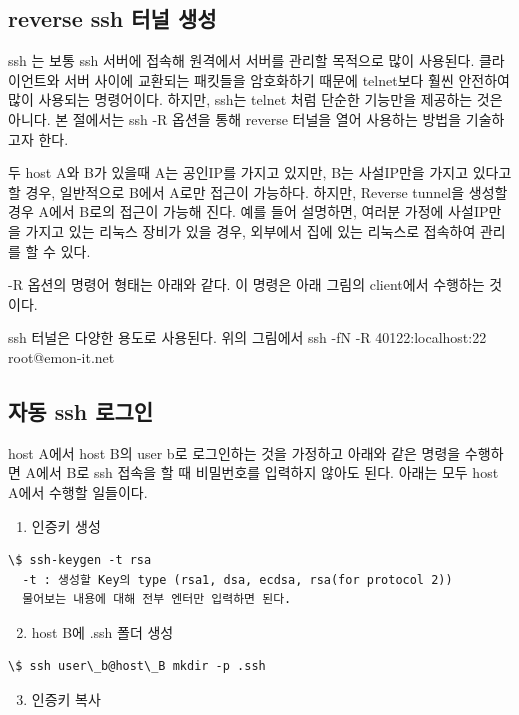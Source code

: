 \documentclass[letterpaper,10pt,english]{sphinxmanual}
\begin{document}
\subsection{reverse ssh 터널 생성}
\label{monitoring:reverse-ssh}
ssh 는 보통 ssh 서버에 접속해 원격에서 서버를 관리할 목적으로 많이
사용된다. 클라이언트와 서버 사이에 교환되는 패킷들을 암호화하기 때문에
telnet보다 훨씬 안전하여 많이 사용되는 명령어이다. 하지만, ssh는
telnet 처럼 단순한 기능만을 제공하는 것은 아니다.
본 절에서는 ssh -R 옵션을 통해 reverse 터널을 열어 사용하는 방법을
기술하고자 한다.

두 host A와 B가 있을때 A는 공인IP를 가지고 있지만, B는
사설IP만을 가지고 있다고 할 경우, 일반적으로 B에서 A로만 접근이 가능하다.
하지만, Reverse tunnel을 생성할 경우 A에서 B로의 접근이 가능해 진다.
예를 들어 설명하면, 여러분 가정에 사설IP만을 가지고 있는 리눅스 장비가
있을 경우, 외부에서 집에 있는 리눅스로 접속하여 관리를 할 수 있다.

-R 옵션의 명령어 형태는 아래와 같다. 이 명령은 아래 그림의 client에서 수행하는 것이다.

ssh 터널은 다양한 용도로 사용된다.
위의 그림에서
ssh -fN -R 40122:localhost:22 root@emon-it.net


\subsection{자동 ssh 로그인}
\label{monitoring:ssh}
host A에서 host B의 user b로 로그인하는 것을 가정하고 아래와 같은 명령을 수행하면 A에서 B로 ssh 접속을 할 때 비밀번호를 입력하지 않아도 된다.
아래는 모두 host A에서 수행할 일들이다.
\begin{enumerate}
\item {} 
인증키 생성

\end{enumerate}

\begin{Verbatim}[commandchars=\\\{\}]
\$ ssh-keygen -t rsa
  -t : 생성할 Key의 type (rsa1, dsa, ecdsa, rsa(for protocol 2))
  물어보는 내용에 대해 전부 엔터만 입력하면 된다.
\end{Verbatim}
\begin{enumerate}
\setcounter{enumi}{1}
\item {} 
host B에 .ssh 폴더 생성

\end{enumerate}

\begin{Verbatim}[commandchars=\\\{\}]
\$ ssh user\_b@host\_B mkdir -p .ssh
\end{Verbatim}
\begin{enumerate}
\setcounter{enumi}{2}
\item {} 
인증키 복사

\end{enumerate}
\end{document}
